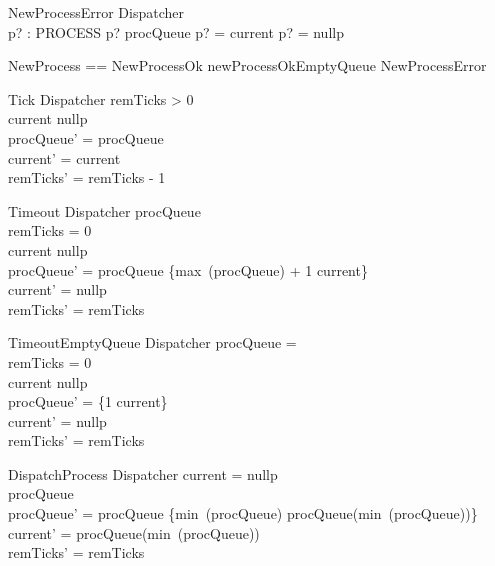 \begin{schema}{NewProcessError}
    \Xi Dispatcher \\
    p? : PROCESS
\where
    p? \in \ran procQueue \lor p? = current \lor p? = nullp
\end{schema}

\begin{zed}
    NewProcess == NewProcessOk \lor newProcessOkEmptyQueue \lor NewProcessError
\end{zed}

\begin{schema}{Tick}
    \Delta Dispatcher
\where
    remTicks > 0 \\
    current \neq nullp \\
    procQueue' = procQueue \\
    current' = current \\
    remTicks' = remTicks - 1    
\end{schema}

\begin{schema}{Timeout}
    \Delta Dispatcher
\where
    procQueue \neq \emptyset \\
    remTicks = 0 \\
    current \neq nullp \\
    procQueue' = procQueue \cup \{max~(\dom procQueue) + 1 \mapsto current\} \\
    current' = nullp \\
    remTicks' = remTicks 
\end{schema}

\begin{schema}{TimeoutEmptyQueue}
    \Delta Dispatcher
\where
    procQueue = \emptyset \\
    remTicks = 0 \\
    current \neq nullp \\
    procQueue' = \{1 \mapsto current\} \\
    current' = nullp \\
    remTicks' = remTicks 
\end{schema}

\begin{schema}{DispatchProcess}
    \Delta Dispatcher
\where
    current = nullp \\
    procQueue \neq \emptyset \\
    procQueue' = procQueue \setminus \{min~(\dom procQueue) \mapsto procQueue(min~(\dom procQueue))\} \\
    current' = procQueue(min~(\dom procQueue)) \\
    remTicks' = remTicks 
\end{schema}

